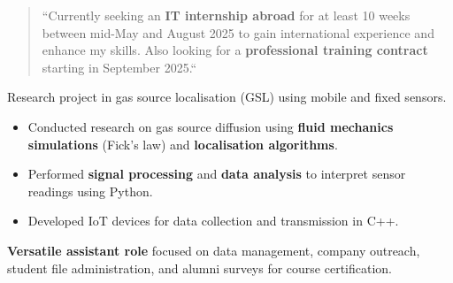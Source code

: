 \documentclass[10pt,a4paper,ragged2e,withhyper]{./AltaCV/altacv}
\begin{document}



\makecvheader



\begin{paracol}{2}

  \begin{quote}
    ``Currently seeking an \textbf{IT internship abroad} for at least 10 weeks between mid-May and August 2025 to gain international experience and enhance my skills.
    Also looking for a \textbf{professional training contract} starting in September 2025.``
  \end{quote}



  Research project in gas source localisation (GSL) using mobile and fixed sensors.
  
  \begin{itemize}
    \item Conducted research on gas source diffusion using \textbf{fluid mechanics simulations} (Fick's law) and \textbf{localisation algorithms}.
    \item Performed \textbf{signal processing} and \textbf{data analysis} to interpret sensor readings using Python.
    \item Developed IoT devices for data collection and transmission in C++.
  \end{itemize}

  \divider


  \textbf{Versatile assistant role} focused on data management, company outreach, student file administration, and alumni surveys for course certification.

  \divider



\end{paracol}
\end{document}
